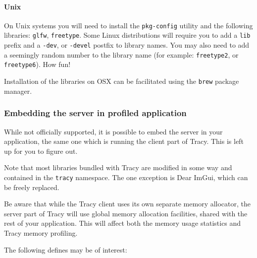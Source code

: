 \documentclass[hidelinks,titlepage,a4paper]{article}
\begin{document}
\paragraph{Unix}

On Unix systems you will need to install the \texttt{pkg-config} utility and the following libraries: \texttt{glfw}, \texttt{freetype}. Some Linux distributions will require you to add a \texttt{lib} prefix and a \texttt{-dev}, or \texttt{-devel} postfix to library names. You may also need to add a seemingly random number to the library name (for example: \texttt{freetype2}, or \texttt{freetype6}). How fun!

Installation of the libraries on OSX can be facilitated using the \texttt{brew} package manager.

\subsubsection{Embedding the server in profiled application}
\label{embeddingserver}

While not officially supported, it is possible to embed the server in your application, the same one which is running the client part of Tracy. This is left up for you to figure out.

Note that most libraries bundled with Tracy are modified in some way and contained in the \texttt{tracy} namespace. The one exception is Dear ImGui, which can be freely replaced.

Be aware that while the Tracy client uses its own separate memory allocator, the server part of Tracy will use global memory allocation facilities, shared with the rest of your application. This will affect both the memory usage statistics and Tracy memory profiling.

The following defines may be of interest:
\end{document}
